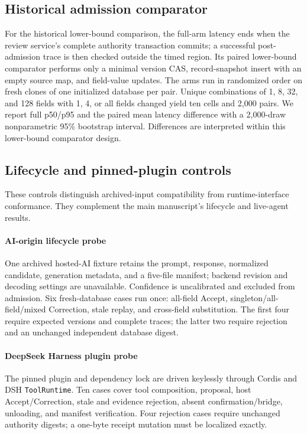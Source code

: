 \documentclass[preprint,12pt,authoryear]{elsarticle}
\newcommand{\code}[1]{\nolinkurl{#1}}
\begin{document}
\subsection{Historical admission comparator}
For the historical lower-bound comparison, the full-arm latency ends when the review service's complete authority transaction commits; a successful post-admission trace is then checked outside the timed region. Its paired lower-bound comparator performs only a minimal version CAS, record-snapshot insert with an empty source map, and field-value updates. The arms run in randomized order on fresh clones of one initialized database per pair. Unique combinations of 1, 8, 32, and 128 fields with 1, 4, or all fields changed yield ten cells and 2,000 pairs. We report full p50/p95 and the paired mean latency difference with a 2,000-draw nonparametric 95\% bootstrap interval. Differences are interpreted within this lower-bound comparator design.


\subsection{Lifecycle and pinned-plugin controls}
These controls distinguish archived-input compatibility from runtime-interface conformance. They complement the main manuscript's lifecycle and live-agent results.

\paragraph{AI-origin lifecycle probe}
One archived hosted-AI fixture retains the prompt, response, normalized candidate, generation metadata, and a five-file manifest; backend revision and decoding settings are unavailable. Confidence is uncalibrated and excluded from admission. Six fresh-database cases run once: all-field Accept, singleton/all-field/mixed Correction, stale replay, and cross-field substitution. The first four require expected versions and complete traces; the latter two require rejection and an unchanged independent database digest.

\paragraph{DeepSeek Harness plugin probe}
The pinned plugin and dependency lock are driven keylessly through Cordis and DSH \code{ToolRuntime}. Ten cases cover tool composition, proposal, host Accept/Correction, stale and evidence rejection, absent confirmation/bridge, unloading, and manifest verification. Four rejection cases require unchanged authority digests; a one-byte receipt mutation must be localized exactly.
\end{document}

